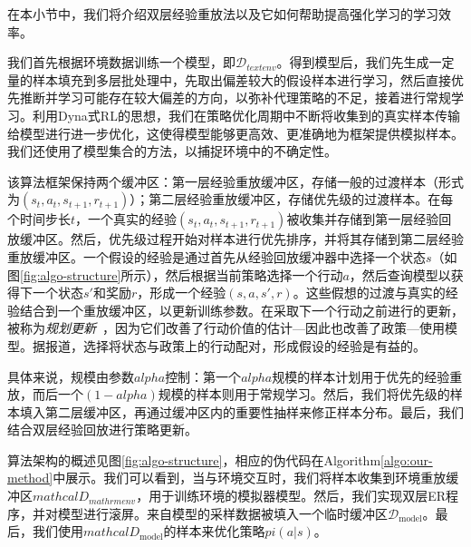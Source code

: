 在本小节中，我们将介绍双层经验重放法以及它如何帮助提高强化学习的学习效率。

我们首先根据环境数据训练一个模型，即$\mathcal{D}_{text{env}}$。得到模型后，我们先生成一定量的样本填充到多层批处理中，先取出偏差较大的假设样本进行学习，然后直接优先推断并学习可能存在较大偏差的方向，以弥补代理策略的不足，接着进行常规学习。利用Dyna式RL的思想，我们在策略优化周期中不断将收集到的真实样本传输给模型进行进一步优化，这使得模型能够更高效、更准确地为框架提供模拟样本。我们还使用了模型集合的方法，以捕捉环境中的不确定性。

该算法框架保持两个缓冲区：第一层经验重放缓冲区，存储一般的过渡样本（形式为$(s_t, a_t, s_{t+1}, r_{t+1})$）；第二层经验重放缓冲区，存储优先级的过渡样本。在每个时间步长$t$，一个真实的经验$(s_t, a_t, s_{t+1}, r_{t+1})$被收集并存储到第一层经验回放缓冲区。然后，优先级过程开始对样本进行优先排序，并将其存储到第二层经验重放缓冲区。一个假设的经验是通过首先从经验回放缓冲器中选择一个状态$s$（如图\ref{fig:algo-structure}所示），然后根据当前策略选择一个行动$a$，然后查询模型以获得下一个状态$s'$和奖励$r$，形成一个经验$(s, a, s', r)$。这些假想的过渡与真实的经验结合到一个重放缓冲区，以更新训练参数。在采取下一个行动之前进行的更新，被称为\emph{规划更新}~\cite{sutton2018intro}，因为它们改善了行动价值的估计---因此也改善了政策---使用模型。据报道，选择将状态与政策上的行动配对，形成假设的经验是有益的\cite{gu2016continuous,yangchen2018rem,janner2019trustmodel}。



具体来说，规模由参数$alpha$控制：第一个$alpha$规模的样本计划用于优先的经验重放，而后一个$(1-alpha)$规模的样本则用于常规学习。然后，我们将优先级的样本填入第二层缓冲区，再通过缓冲区内的重要性抽样来修正样本分布。最后，我们结合双层经验回放进行策略更新。

算法架构的概述见图\ref{fig:algo-structure}，相应的伪代码在Algorithm\ref{algo:our-method}中展示。我们可以看到，当与环境交互时，我们将样本收集到环境重放缓冲区$mathcal{D}_{mathrm{env}}$，用于训练环境的模拟器模型。然后，我们实现双层ER程序，并对模型进行滚屏。来自模型的采样数据被填入一个临时缓冲区$\mathcal{D}_\mathrm{model}$。最后，我们使用$mathcal{D}_\mathrm{model}$的样本来优化策略$pi(a|s)$。